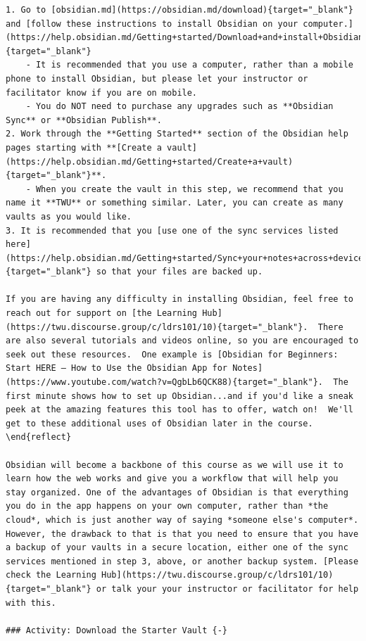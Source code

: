 \documentclass[
]{book}
\theoremstyle{definition}
\theoremstyle{definition}
\theoremstyle{definition}
\theoremstyle{definition}
\theoremstyle{remark}
\begin{document}
\begin{verbatim}
1. Go to [obsidian.md](https://obsidian.md/download){target="_blank"} and [follow these instructions to install Obsidian on your computer.](https://help.obsidian.md/Getting+started/Download+and+install+Obsidian){target="_blank"}
    - It is recommended that you use a computer, rather than a mobile phone to install Obsidian, but please let your instructor or facilitator know if you are on mobile.
    - You do NOT need to purchase any upgrades such as **Obsidian Sync** or **Obsidian Publish**.
2. Work through the **Getting Started** section of the Obsidian help pages starting with **[Create a vault](https://help.obsidian.md/Getting+started/Create+a+vault){target="_blank"}**.
    - When you create the vault in this step, we recommend that you name it **TWU** or something similar. Later, you can create as many vaults as you would like.
3. It is recommended that you [use one of the sync services listed here](https://help.obsidian.md/Getting+started/Sync+your+notes+across+devices){target="_blank"} so that your files are backed up.   

If you are having any difficulty in installing Obsidian, feel free to reach out for support on [the Learning Hub](https://twu.discourse.group/c/ldrs101/10){target="_blank"}.  There are also several tutorials and videos online, so you are encouraged to seek out these resources.  One example is [Obsidian for Beginners: Start HERE — How to Use the Obsidian App for Notes](https://www.youtube.com/watch?v=QgbLb6QCK88){target="_blank"}.  The first minute shows how to set up Obsidian...and if you'd like a sneak peek at the amazing features this tool has to offer, watch on!  We'll get to these additional uses of Obsidian later in the course.
\end{reflect}

Obsidian will become a backbone of this course as we will use it to learn how the web works and give you a workflow that will help you stay organized. One of the advantages of Obsidian is that everything you do in the app happens on your own computer, rather than *the cloud*, which is just another way of saying *someone else's computer*. However, the drawback to that is that you need to ensure that you have a backup of your vaults in a secure location, either one of the sync services mentioned in step 3, above, or another backup system. [Please check the Learning Hub](https://twu.discourse.group/c/ldrs101/10){target="_blank"} or talk your your instructor or facilitator for help with this.

### Activity: Download the Starter Vault {-}


\end{verbatim}
\end{document}
